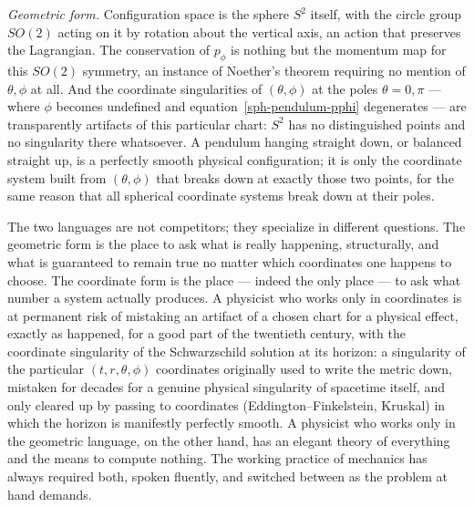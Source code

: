 \emph{Geometric form.} Configuration space is the sphere $S^2$
itself, with the circle group $SO(2)$ acting on it by rotation about
the vertical axis, an action that preserves the Lagrangian. The
conservation of $p_\phi$ is nothing but the momentum map for this
$SO(2)$ symmetry, an instance of Noether's theorem requiring no
mention of $\theta,\phi$ at all. And the coordinate singularities of
$(\theta,\phi)$ at the poles $\theta=0,\pi$ --- where $\phi$ becomes
undefined and equation~\eqref{sph-pendulum-pphi} degenerates ---
are transparently artifacts of this particular chart: $S^2$ has no
distinguished points and no singularity there whatsoever. A pendulum
hanging straight down, or balanced straight up, is a perfectly smooth
physical configuration; it is only the coordinate system built from
$(\theta,\phi)$ that breaks down at exactly those two points, for the
same reason that all spherical coordinate systems break down at their
poles.

The two languages are not competitors; they specialize in different
questions. The geometric form is the place to ask what is really
happening, structurally, and what is guaranteed to remain true no
matter which coordinates one happens to choose. The coordinate form
is the place --- indeed the only place --- to ask what number a
system actually produces. A physicist who works only in coordinates
is at permanent risk of mistaking an artifact of a chosen chart for a
physical effect, exactly as happened, for a good part of the
twentieth century, with the coordinate singularity of the
Schwarzschild solution at its horizon: a singularity of the
particular $(t,r,\theta,\phi)$ coordinates originally used to write
the metric down, mistaken for decades for a genuine physical
singularity of spacetime itself, and only cleared up by passing to
coordinates (Eddington--Finkelstein, Kruskal) in which the horizon is
manifestly perfectly smooth. A physicist who
works only in the geometric language, on the other hand, has an
elegant theory of everything and the means to compute nothing. The
working practice of mechanics has always required both, spoken
fluently, and switched between as the problem at hand demands.


